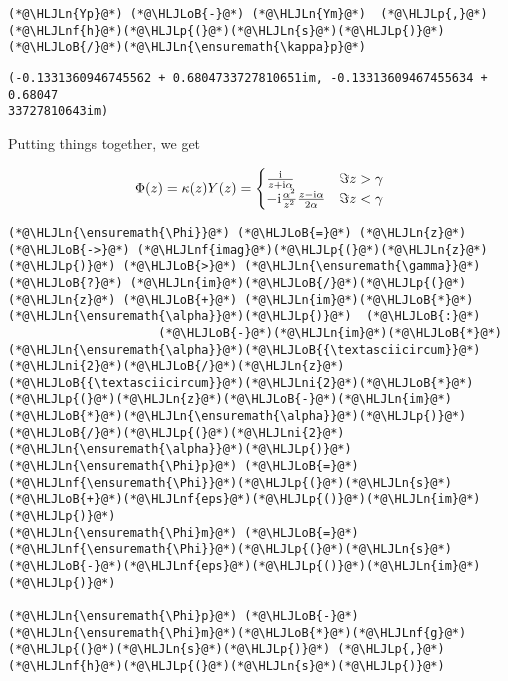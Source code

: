 \documentclass[12pt,landscape]{article}
\newcommand{\HLJLn}[1]{#1}
\newcommand{\HLJLnf}[1]{\textcolor[RGB]{66,102,213}{#1}}
\newcommand{\HLJLni}[1]{\textcolor[RGB]{59,151,46}{#1}}
\newcommand{\HLJLoB}[1]{\textcolor[RGB]{102,102,102}{\textbf{#1}}}
\newcommand{\HLJLp}[1]{#1}
\def\I{ {\rm i} }
\begin{document}
{\begin{lstlisting}
(*@\HLJLn{Yp}@*) (*@\HLJLoB{-}@*) (*@\HLJLn{Ym}@*)  (*@\HLJLp{,}@*) (*@\HLJLnf{h}@*)(*@\HLJLp{(}@*)(*@\HLJLn{s}@*)(*@\HLJLp{)}@*)(*@\HLJLoB{/}@*)(*@\HLJLn{\ensuremath{\kappa}p}@*)
\end{lstlisting}

\begin{lstlisting}
(-0.1331360946745562 + 0.6804733727810651im, -0.13313609467455634 + 0.68047
33727810643im)
\end{lstlisting}


Putting things together, we get

\[
\Phi(z) = \kappa(z) Y(z) = \begin{cases} {\I \over z+\I \alpha }& \Im z > \gamma \\
                        -\I {\alpha^2 \over z^2} {z-\I \alpha \over 2 \alpha} & \Im z < \gamma
\end{cases}
\]

\begin{lstlisting}
(*@\HLJLn{\ensuremath{\Phi}}@*) (*@\HLJLoB{=}@*) (*@\HLJLn{z}@*) (*@\HLJLoB{->}@*) (*@\HLJLnf{imag}@*)(*@\HLJLp{(}@*)(*@\HLJLn{z}@*)(*@\HLJLp{)}@*) (*@\HLJLoB{>}@*) (*@\HLJLn{\ensuremath{\gamma}}@*) (*@\HLJLoB{?}@*) (*@\HLJLn{im}@*)(*@\HLJLoB{/}@*)(*@\HLJLp{(}@*)(*@\HLJLn{z}@*) (*@\HLJLoB{+}@*) (*@\HLJLn{im}@*)(*@\HLJLoB{*}@*)(*@\HLJLn{\ensuremath{\alpha}}@*)(*@\HLJLp{)}@*)  (*@\HLJLoB{:}@*)
                     (*@\HLJLoB{-}@*)(*@\HLJLn{im}@*)(*@\HLJLoB{*}@*)(*@\HLJLn{\ensuremath{\alpha}}@*)(*@\HLJLoB{{\textasciicircum}}@*)(*@\HLJLni{2}@*)(*@\HLJLoB{/}@*)(*@\HLJLn{z}@*)(*@\HLJLoB{{\textasciicircum}}@*)(*@\HLJLni{2}@*)(*@\HLJLoB{*}@*) (*@\HLJLp{(}@*)(*@\HLJLn{z}@*)(*@\HLJLoB{-}@*)(*@\HLJLn{im}@*)(*@\HLJLoB{*}@*)(*@\HLJLn{\ensuremath{\alpha}}@*)(*@\HLJLp{)}@*)(*@\HLJLoB{/}@*)(*@\HLJLp{(}@*)(*@\HLJLni{2}@*)(*@\HLJLn{\ensuremath{\alpha}}@*)(*@\HLJLp{)}@*)
(*@\HLJLn{\ensuremath{\Phi}p}@*) (*@\HLJLoB{=}@*) (*@\HLJLnf{\ensuremath{\Phi}}@*)(*@\HLJLp{(}@*)(*@\HLJLn{s}@*)(*@\HLJLoB{+}@*)(*@\HLJLnf{eps}@*)(*@\HLJLp{()}@*)(*@\HLJLn{im}@*)(*@\HLJLp{)}@*)
(*@\HLJLn{\ensuremath{\Phi}m}@*) (*@\HLJLoB{=}@*) (*@\HLJLnf{\ensuremath{\Phi}}@*)(*@\HLJLp{(}@*)(*@\HLJLn{s}@*)(*@\HLJLoB{-}@*)(*@\HLJLnf{eps}@*)(*@\HLJLp{()}@*)(*@\HLJLn{im}@*)(*@\HLJLp{)}@*)

(*@\HLJLn{\ensuremath{\Phi}p}@*) (*@\HLJLoB{-}@*) (*@\HLJLn{\ensuremath{\Phi}m}@*)(*@\HLJLoB{*}@*)(*@\HLJLnf{g}@*)(*@\HLJLp{(}@*)(*@\HLJLn{s}@*)(*@\HLJLp{)}@*) (*@\HLJLp{,}@*) (*@\HLJLnf{h}@*)(*@\HLJLp{(}@*)(*@\HLJLn{s}@*)(*@\HLJLp{)}@*)
\end{lstlisting}

}
\end{document}
